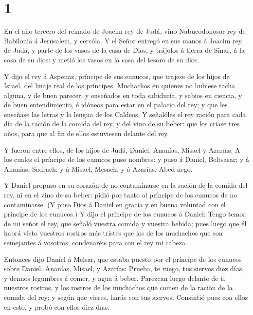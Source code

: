 \hypertarget{section}{%
\section{1}\label{section}}

 En el año tercero del reinado de Joacim rey de Judá, vino
Nabucodonosor rey de Babilonia á Jerusalem, y cercóla.  Y el
Señor entregó en sus manos á Joacim rey de Judá, y parte de los vasos de
la casa de Dios, y trájolos á tierra de Sinar, á la casa de su dios: y
metió los vasos en la casa del tesoro de su dios.

 Y dijo el rey á Aspenaz, príncipe de sus eunucos, que
trajese de los hijos de Israel, del linaje real de los príncipes,
 Muchachos en quienes no hubiese tacha alguna, y de buen
parecer, y enseñados en toda sabiduría, y sabios en ciencia, y de buen
entendimiento, é idóneos para estar en el palacio del rey; y que les
enseñase las letras y la lengua de los Caldeos.  Y señalóles
el rey ración para cada día de la ración de la comida del rey, y del
vino de su beber: que los criase tres años, para que al fin de ellos
estuviesen delante del rey.

 Y fueron entre ellos, de los hijos de Judá, Daniel,
Ananías, Misael y Azarías:  A los cuales el príncipe de los
eunucos puso nombres: y puso á Daniel, Beltsasar; y á Ananías, Sadrach;
y á Misael, Mesach; y á Azarías, Abed-nego.

 Y Daniel propuso en su corazón de no contaminarse en la
ración de la comida del rey, ni en el vino de su beber: pidió por tanto
al príncipe de los eunucos de no contaminarse.  (Y puso Dios
á Daniel en gracia y en buena voluntad con el príncipe de los eunucos.)
 Y dijo el príncipe de los eunucos á Daniel: Tengo temor de
mi señor el rey, que señaló vuestra comida y vuestra bebida; pues luego
que él habrá visto vuestros rostros más tristes que los de los muchachos
que son semejantes á vosotros, condenaréis para con el rey mi cabeza.

 Entonces dijo Daniel á Melsar, que estaba puesto por el
príncipe de los eunucos sobre Daniel, Ananías, Misael, y Azarías:
 Prueba, te ruego, tus siervos diez días, y dennos
legumbres á comer, y agua á beber.  Parezcan luego delante
de ti nuestros rostros, y los rostros de los muchachos que comen de la
ración de la comida del rey; y según que vieres, harás con tus siervos.
 Consintió pues con ellos en esto, y probó con ellos diez
días.

